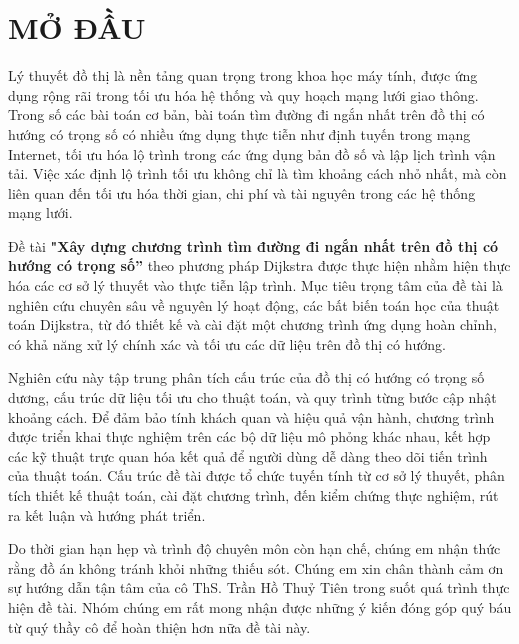 \documentclass[12pt,a4paper,oneside]{report}
\begin{document}
\newpage
{}
\renewcommand{\contentsname}{MỤC LỤC}

\addcontentsline{toc}{chapter}{\contentsname}
\tableofcontents

\newpage
\renewcommand{\listfigurename}{DANH MỤC HÌNH VẼ}
\addcontentsline{toc}{chapter}{\listfigurename}
\listoffigures

\newpage
{}
\chapter*{MỞ ĐẦU}
Lý thuyết đồ thị là nền tảng quan trọng trong khoa học máy tính, được ứng dụng rộng rãi trong tối ưu hóa hệ thống và quy hoạch mạng lưới giao thông. Trong số các bài toán cơ bản, bài toán tìm đường đi ngắn nhất trên đồ thị có hướng có trọng số có nhiều ứng dụng thực tiễn như định tuyến trong mạng Internet, tối ưu hóa lộ trình trong các ứng dụng bản đồ số và lập lịch trình vận tải. Việc xác định lộ trình tối ưu không chỉ là tìm khoảng cách nhỏ nhất, mà còn liên quan đến tối ưu hóa thời gian, chi phí và tài nguyên trong các hệ thống mạng lưới.

Đề tài \textbf{"Xây dựng chương trình tìm đường đi ngắn nhất trên đồ thị có hướng có trọng số”} theo phương pháp Dijkstra được thực hiện nhằm hiện thực hóa các cơ sở lý thuyết vào thực tiễn lập trình. Mục tiêu trọng tâm của đề tài là nghiên cứu chuyên sâu về nguyên lý hoạt động, các bất biến toán học của thuật toán Dijkstra, từ đó thiết kế và cài đặt một chương trình ứng dụng hoàn chỉnh, có khả năng xử lý chính xác và tối ưu các dữ liệu trên đồ thị có hướng.

Nghiên cứu này tập trung phân tích cấu trúc của đồ thị có hướng có trọng số dương, cấu trúc dữ liệu tối ưu cho thuật toán, và quy trình từng bước cập nhật khoảng cách. Để đảm bảo tính khách quan và hiệu quả vận hành, chương trình được triển khai thực nghiệm trên các bộ dữ liệu mô phỏng khác nhau, kết hợp các kỹ thuật trực quan hóa kết quả để người dùng dễ dàng theo dõi tiến trình của thuật toán. Cấu trúc đề tài được tổ chức tuyến tính từ cơ sở lý thuyết, phân tích thiết kế thuật toán, cài đặt chương trình, đến kiểm chứng thực nghiệm, rút ra kết luận và hướng phát triển.

Do thời gian hạn hẹp và trình độ chuyên môn còn hạn chế, chúng em nhận thức rằng đồ án không tránh khỏi những thiếu sót. Chúng em xin chân thành cảm ơn sự hướng dẫn tận tâm của cô ThS. Trần Hồ Thuỷ Tiên trong suốt quá trình thực hiện đề tài. Nhóm chúng em rất mong nhận được những ý kiến đóng góp quý báu từ quý thầy cô để hoàn thiện hơn nữa đề tài này.
\end{document}
